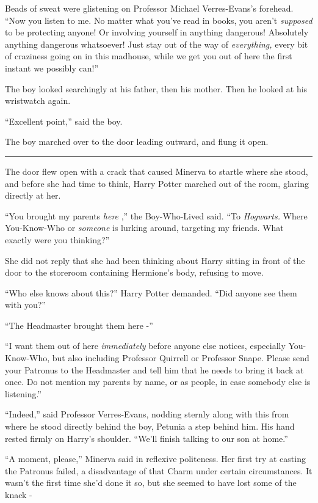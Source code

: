 Beads of sweat were glistening on Professor Michael Verres-Evans's
forehead. ``Now you listen to me. No matter what you've read in books,
you aren't \emph{supposed} to be protecting anyone! Or involving
yourself in anything dangerous! Absolutely anything dangerous
whatsoever! Just stay out of the way of \emph{everything,} every bit of
craziness going on in this madhouse, while we get you out of here the
first instant we possibly can!''

The boy looked searchingly at his father, then his mother. Then he
looked at his wristwatch again.

``Excellent point,'' said the boy.

The boy marched over to the door leading outward, and flung it open.

\begin{center}\rule{3in}{0.4pt}\end{center}

The door flew open with a crack that caused Minerva to startle where she
stood, and before she had time to think, Harry Potter marched out of the
room, glaring directly at her.

``You brought my parents \emph{here} ,'' the Boy-Who-Lived said. ``To
\emph{Hogwarts.} Where You-Know-Who or \emph{someone} is lurking around,
targeting my friends. What exactly were you thinking?''

She did not reply that she had been thinking about Harry sitting in
front of the door to the storeroom containing Hermione's body, refusing
to move.

``Who else knows about this?'' Harry Potter demanded. ``Did anyone see
them with you?''

``The Headmaster brought them here -''

``I want them out of here \emph{immediately} before anyone else notices,
especially You-Know-Who, but also including Professor Quirrell or
Professor Snape. Please send your Patronus to the Headmaster and tell
him that he needs to bring it back at once. Do not mention my parents by
name, or as people, in case somebody else is listening.''

``Indeed,'' said Professor Verres-Evans, nodding sternly along with this
from where he stood directly behind the boy, Petunia a step behind him.
His hand rested firmly on Harry's shoulder. ``We'll finish talking to
our son at home.''

``A moment, please,'' Minerva said in reflexive politeness. Her first
try at casting the Patronus failed, a disadvantage of that Charm under
certain circumstances. It wasn't the first time she'd done it so, but
she seemed to have lost some of the knack -

